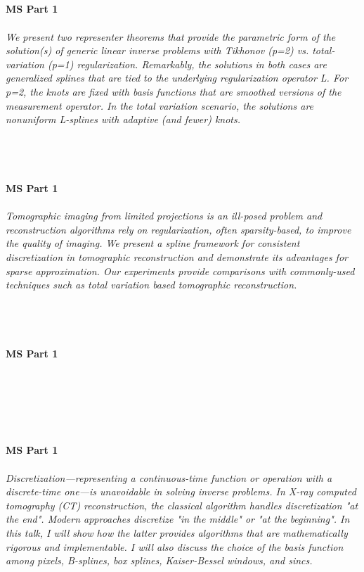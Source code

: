 \begin{multicols}{2}
\\ 
    \\
    \\\\
    \noindent\textbf{MS Part 1}\\
\\  
    \textit{We present two representer theorems that provide the parametric form of the solution(s) of generic linear inverse problems with Tikhonov (p=2) vs. total-variation (p=1) regularization. Remarkably, the solutions in both cases are generalized splines that are tied to the underlying regularization operator L. For p=2, the knots are fixed with basis functions that are smoothed versions of the measurement operator. In the total variation scenario, the solutions are nonuniform L-splines with adaptive (and fewer) knots.}\\
\\ 
    \\
    \\\\
    \noindent\textbf{MS Part 1}\\
\\  
    \textit{Tomographic imaging from limited projections is an ill-posed problem and reconstruction algorithms rely on regularization, often sparsity-based, to improve the quality of imaging. We present a spline framework for consistent discretization in tomographic reconstruction and demonstrate its advantages for sparse approximation. Our experiments provide comparisons with commonly-used techniques such as total variation based tomographic reconstruction.}\\
\\ 
    \\
    \\\\
    \noindent\textbf{MS Part 1}\\
\\  
    \textit{}\\
\\ 
    \\
    \\\\
    \noindent\textbf{MS Part 1}\\
\\  
    \textit{Discretization—representing a continuous-time function or operation with a discrete-time one—is unavoidable in solving inverse problems. In X-ray computed tomography (CT) reconstruction, the classical algorithm handles discretization "at the end". Modern approaches discretize "in the middle" or "at the beginning". In this talk, I will show how the latter provides algorithms that are mathematically rigorous and implementable. I will also discuss the choice of the basis function among pixels, B-splines, box splines, Kaiser-Bessel windows, and sincs.}\\

\end{multicols}
